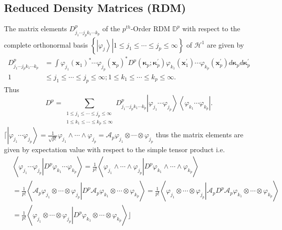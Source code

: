 \documentclass[aps,preprint]{revtex4}%
\begin{document}
\subsection{Reduced Density Matrices (RDM) \label{RDM}}

The matrix elements $D_{j_{1}\cdots j_{p}k_{1}\cdots k_{p}}^{p}$ of the
$p^{th}$-Order RDM $\mathbb{D}^{p}$ with respect to the complete orthonormal
basis $\left\{  \left.  \left\vert \varphi_{j}\right\rangle \right\vert 1\leq
j_{1}\leq\cdots\leq j_{p}\leq\infty\right\}  $ of $\mathcal{H}^{1}$ are given
by%
\begin{align}
D_{j_{1}\cdots j_{p}k_{1}\cdots k_{p}}^{p}  &  =\int\varphi_{j_{1}}\left(
\boldsymbol{x}_{1}\right)  ^{\ast}\cdots\varphi_{j_{p}}\left(  \boldsymbol{x}%
_{p}\right)  ^{\ast}D^{p}\left(  \boldsymbol{\kappa}_{p};\boldsymbol{\kappa
}_{p}^{\prime}\right)  \varphi_{k_{1}}\left(  \boldsymbol{x}_{1}^{\prime
}\right)  \cdots\varphi_{k_{p}}\left(  \boldsymbol{x}_{p}^{\prime}\right)
d\boldsymbol{\kappa}_{p}d\boldsymbol{\kappa}_{p}^{\prime}\\
1  &  \leq j_{1}\leq\cdots\leq j_{p}\leq\infty;1\leq k_{1}\leq\cdots\leq
k_{p}\leq\infty.
\end{align}
Thus
\begin{equation}
D^{p}=\sum_{\substack{1\leq j_{1}\leq\cdots\leq j_{p}\leq\infty\\1\leq
k_{1}\leq\cdots\leq k_{p}\leq\infty}}D_{j_{1}\cdots j_{p}k_{1}\cdots k_{p}%
}^{p}\left\vert \varphi_{j_{1}}\cdots\varphi_{j_{p}}\right\rangle \left\langle
\varphi_{k_{1}}\cdots\varphi_{k_{p}}\right\vert .
\end{equation}
$\lceil\left\vert \varphi_{j_{1}}\cdots\varphi_{j_{p}}\right\rangle =\frac
{1}{\sqrt{p!}}\varphi_{j_{1}}\wedge\cdots\wedge\varphi_{j_{p}}=\mathcal{A}%
_{p}\varphi_{j_{1}}\otimes\cdots\otimes\varphi_{j_{p}}$ thus the matrix
elements are given by expectation value with respect to the simple tensor
product i.e.
\begin{align}
&  \left\langle \left.  \varphi_{j_{1}}\cdots\varphi_{j_{p}}\right\vert
D^{p}\varphi_{k_{1}}\cdots\varphi_{k_{p}}\right\rangle =\frac{1}%
{p!}\left\langle \left.  \varphi_{j_{1}}\wedge\cdots\wedge\varphi_{j_{p}%
}\right\vert D^{p}\varphi_{k_{1}}\wedge\cdots\wedge\varphi_{k_{p}%
}\right\rangle \\
&  =\frac{1}{p!}\left\langle \left.  \mathcal{A}_{p}\varphi_{j_{1}}%
\otimes\cdots\otimes\varphi_{j_{p}}\right\vert D^{p}\mathcal{A}_{p}%
\varphi_{k_{1}}\otimes\cdots\otimes\varphi_{k_{p}}\right\rangle =\frac{1}%
{p!}\left\langle \left.  \varphi_{j_{1}}\otimes\cdots\otimes\varphi_{j_{p}%
}\right\vert \mathcal{A}_{p}D^{p}\mathcal{A}_{p}\varphi_{k_{1}}\otimes
\cdots\otimes\varphi_{k_{p}}\right\rangle \\
&  =\frac{1}{p!}\left\langle \left.  \varphi_{j_{1}}\otimes\cdots
\otimes\varphi_{j_{p}}\right\vert D^{p}\varphi_{k_{1}}\otimes\cdots
\otimes\varphi_{k_{p}}\right\rangle \rfloor
\end{align}
\end{document}
